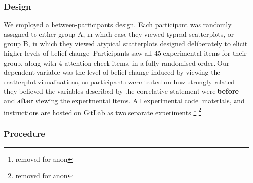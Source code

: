 \documentclass[manuscript,screen,review,anonymous]{acmart}
\begin{document}
\subsubsection{Design}\label{sec-design-main}

We employed a between-participants design. Each participant was randomly
assigned to either group A, in which case they viewed typical
scatterplots, or group B, in which they viewed atypical scatterplots
designed deliberately to elicit higher levels of belief change.
Participants saw all 45 experimental items for their group, along with 4
attention check items, in a fully randomised order. Our dependent
variable was the level of belief change induced by viewing the
scatterplot visualizations, so participants were tested on how strongly
related they believed the variables described by the correlative
statement were \textbf{before} and \textbf{after} viewing the
experimental items. All experimental code, materials, and instructions
are hosted on GitLab as two separate experiments \footnote{removed for
  anon} \footnote{removed for anon}

\subsubsection{Procedure}\label{sec-procedure-main}
\end{document}
